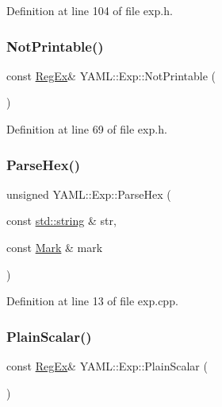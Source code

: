 Definition at line 104 of file exp.\+h.

\mbox{\label{namespace_y_a_m_l_1_1_exp_a0888fe94e77d16b4ba8be356e9fbb102}} 
\subsubsection{\texorpdfstring{NotPrintable()}{NotPrintable()}}
{\footnotesize\ttfamily const \mbox{\hyperlink{class_y_a_m_l_1_1_reg_ex}{Reg\+Ex}}\& Y\+A\+M\+L\+::\+Exp\+::\+Not\+Printable (\begin{DoxyParamCaption}{ }\end{DoxyParamCaption})\hspace{0.3cm}{\ttfamily [inline]}}



Definition at line 69 of file exp.\+h.

\mbox{\label{namespace_y_a_m_l_1_1_exp_a30bb3334bfe4ffc2020d70a452e14696}} 
\subsubsection{\texorpdfstring{ParseHex()}{ParseHex()}}
{\footnotesize\ttfamily unsigned Y\+A\+M\+L\+::\+Exp\+::\+Parse\+Hex (\begin{DoxyParamCaption}\item[{const \mbox{\hyperlink{glad_8h_ac83513893df92266f79a515488701770}{std\+::string}} \&}]{str,  }\item[{const \mbox{\hyperlink{struct_y_a_m_l_1_1_mark}{Mark}} \&}]{mark }\end{DoxyParamCaption})}



Definition at line 13 of file exp.\+cpp.

\mbox{\label{namespace_y_a_m_l_1_1_exp_a095399f1d1b6b07ea099fdccb163a050}} 
\subsubsection{\texorpdfstring{PlainScalar()}{PlainScalar()}}
{\footnotesize\ttfamily const \mbox{\hyperlink{class_y_a_m_l_1_1_reg_ex}{Reg\+Ex}}\& Y\+A\+M\+L\+::\+Exp\+::\+Plain\+Scalar (\begin{DoxyParamCaption}{ }\end{DoxyParamCaption})\hspace{0.3cm}{\ttfamily [inline]}}



